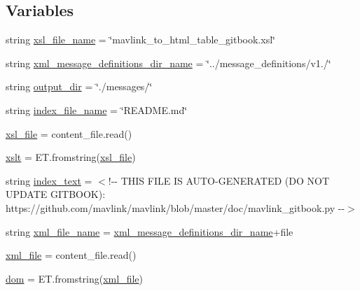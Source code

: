\subsection*{Variables}
\begin{DoxyCompactItemize}
\item 
string \mbox{\hyperlink{namespacemavlink__gitbook_ac6c1e2257086f4c185a1dbe339b982ee}{xsl\+\_\+file\+\_\+name}} = \char`\"{}mavlink\+\_\+to\+\_\+html\+\_\+table\+\_\+gitbook.\+xsl\char`\"{}
\item 
string \mbox{\hyperlink{namespacemavlink__gitbook_a77eba659d76a13449029b543069e297a}{xml\+\_\+message\+\_\+definitions\+\_\+dir\+\_\+name}} = \char`\"{}../message\+\_\+definitions/v1./\char`\"{}
\item 
string \mbox{\hyperlink{namespacemavlink__gitbook_a038f966b01c8835bbafb0d301aafc036}{output\+\_\+dir}} = \char`\"{}./messages/\char`\"{}
\item 
string \mbox{\hyperlink{namespacemavlink__gitbook_a62c09309bc68b41990e44200c18351c5}{index\+\_\+file\+\_\+name}} = \char`\"{}R\+E\+A\+D\+M\+E.\+md\char`\"{}
\item 
\mbox{\hyperlink{namespacemavlink__gitbook_a815a3364aa4eed144f50b92449070e4d}{xsl\+\_\+file}} = content\+\_\+file.\+read()
\item 
\mbox{\hyperlink{namespacemavlink__gitbook_a6fdcf2e9551166072265847a9efbcc9b}{xslt}} = E\+T.\+fromstring(\mbox{\hyperlink{namespacemavlink__gitbook_a815a3364aa4eed144f50b92449070e4d}{xsl\+\_\+file}})
\item 
string \mbox{\hyperlink{namespacemavlink__gitbook_a03742fa597e2b6b6fa05847955012350}{index\+\_\+text}} = \textquotesingle{}$<$!-\/-\/ T\+H\+IS F\+I\+LE IS A\+U\+TO-\/G\+E\+N\+E\+R\+A\+T\+ED (DO N\+OT U\+P\+D\+A\+TE G\+I\+T\+B\+O\+OK)\+: https\+://github.\+com/mavlink/mavlink/blob/master/doc/mavlink\+\_\+gitbook.\+py -\/-\/$>$\textquotesingle{}
\item 
string \mbox{\hyperlink{namespacemavlink__gitbook_a290dd8831d31b5ea4959bbd4232dc591}{xml\+\_\+file\+\_\+name}} = \mbox{\hyperlink{namespacemavlink__gitbook_a77eba659d76a13449029b543069e297a}{xml\+\_\+message\+\_\+definitions\+\_\+dir\+\_\+name}}+file
\item 
\mbox{\hyperlink{namespacemavlink__gitbook_ac775536f765d6de771c4504a54332d8b}{xml\+\_\+file}} = content\+\_\+file.\+read()
\item 
\mbox{\hyperlink{namespacemavlink__gitbook_a5f783465a58c3fc0dc9a7c5513c06e77}{dom}} = E\+T.\+fromstring(\mbox{\hyperlink{namespacemavlink__gitbook_ac775536f765d6de771c4504a54332d8b}{xml\+\_\+file}})

\end{DoxyCompactItemize}
